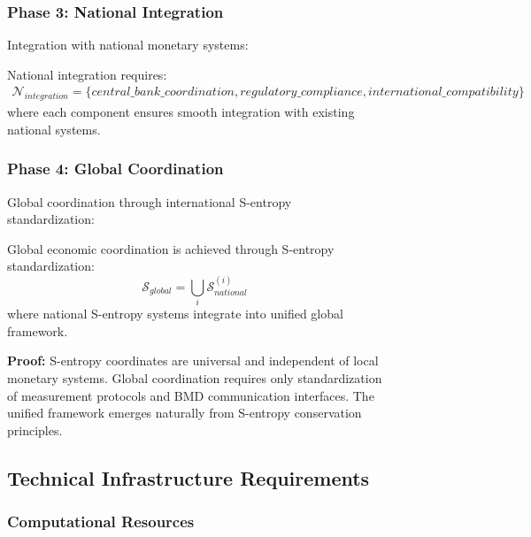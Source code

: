\begin{figure}[h]
    \subsubsection{Phase 3: National Integration}
    
    Integration with national monetary systems:
    
    \begin{definition}
    National integration requires:
    \begin{align}
    \mathcal{N}_{integration} = \{central\_bank\_coordination, regulatory\_compliance, international\_compatibility\}
    \end{align}
    where each component ensures smooth integration with existing national systems.
    \end{definition}
    
    \subsubsection{Phase 4: Global Coordination}
    
    Global coordination through international S-entropy standardization:
    
    \begin{theorem}
    Global economic coordination is achieved through S-entropy standardization:
    \begin{equation}
    \mathcal{S}_{global} = \bigcup_{i} \mathcal{S}_{national}^{(i)}
    \end{equation}
    where national S-entropy systems integrate into unified global framework.
    
    \textbf{Proof:}
    S-entropy coordinates are universal and independent of local monetary systems. Global coordination requires only standardization of measurement protocols and BMD communication interfaces. The unified framework emerges naturally from S-entropy conservation principles.
    \end{theorem}
    
    \subsection{Technical Infrastructure Requirements}
    
    \subsubsection{Computational Resources}
    

\end{figure}
